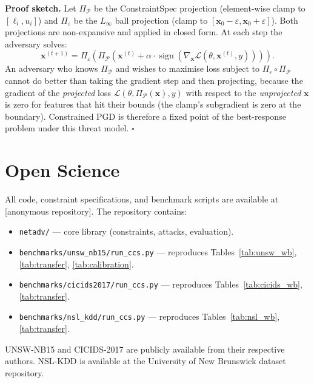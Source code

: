 \documentclass[sigconf,anonymous=true]{acmart}
\begin{document}
\textbf{Proof sketch.}  Let $\Pi_\mathcal{P}$ be the ConstraintSpec
projection (element-wise clamp to $[\ell_i, u_i]$) and
$\Pi_\varepsilon$ be the $L_\infty$ ball projection (clamp to
$[\mathbf{x}_0 - \varepsilon, \mathbf{x}_0 + \varepsilon]$).
Both projections are non-expansive and applied in closed form.
At each step the adversary solves:
\[
  \mathbf{x}^{(t+1)} = \Pi_\varepsilon\!\left(\Pi_\mathcal{P}\!\left(
    \mathbf{x}^{(t)} + \alpha \cdot \operatorname{sign}\!\left(
      \nabla_{\mathbf{x}} \mathcal{L}(\theta, \mathbf{x}^{(t)}, y)
    \right)
  \right)\right).
\]
An adversary who knows $\Pi_\mathcal{P}$ and wishes to maximise loss
subject to $\Pi_\varepsilon \circ \Pi_\mathcal{P}$ cannot do better
than taking the gradient step and then projecting, because the gradient
of the \emph{projected} loss
$\mathcal{L}(\theta, \Pi_\mathcal{P}(\mathbf{x}), y)$
with respect to the \emph{unprojected} $\mathbf{x}$ is zero for
features that hit their bounds (the clamp's subgradient is zero at the
boundary).  Constrained PGD is therefore a fixed point of the
best-response problem under this threat model. $\square$

\section{Open Science}
\label{app:science}

All code, constraint specifications, and benchmark scripts are available
at [anonymous repository].  The repository contains:
\begin{itemize}
  \item \texttt{netadv/} — core library (constraints, attacks, evaluation).
  \item \texttt{benchmarks/unsw\_nb15/run\_ccs.py} — reproduces
        Tables~\ref{tab:unsw_wb}, \ref{tab:transfer},
        \ref{tab:calibration}.
  \item \texttt{benchmarks/cicids2017/run\_ccs.py} — reproduces
        Tables~\ref{tab:cicids_wb}, \ref{tab:transfer}.
  \item \texttt{benchmarks/nsl\_kdd/run\_ccs.py} — reproduces
        Tables~\ref{tab:nsl_wb}, \ref{tab:transfer}.
\end{itemize}
UNSW-NB15 and CICIDS-2017 are publicly available from their respective
authors.  NSL-KDD is available at the University of New Brunswick
dataset repository.

\end{document}

